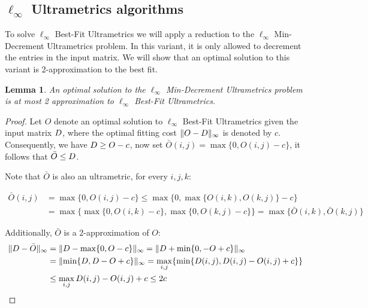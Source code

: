 \documentclass{article}
\newtheorem{lemma}[theorem]{Lemma}
\begin{document}
\subsection{\texorpdfstring{$\ell_\infty$ Ultrametrics algorithms}{l-inf Ultrametrics algorithms}}

\newcommand{\infopttree}{O}
\newcommand{\infmdopttree}{\bar{O}}
\newcommand{\maxoftwo}[2]{\max \{ #1, #2 \}}
\newcommand{\optcost}{c}

To solve $\ell_\infty$ Best-Fit Ultrametrics we will apply a reduction to the $\ell_\infty$ Min-Decrement Ultrametrics problem. In this variant, it is only allowed to decrement the entries in the input matrix. We will show that an optimal solution to this variant is 2-approximation to the best fit.
\begin{lemma}\label{lemma:md_approximation}
An optimal solution to the $\ell_\infty$ Min-Decrement Ultrametrics problem is at most 2 approximation to $\ell_\infty$ Best-Fit Ultrametrics.
\end{lemma}

\begin{proof}
Let $\infopttree$ denote an optimal solution to $\ell_\infty$ Best-Fit Ultrametrics given the input matrix $D$, where the optimal fitting cost $\infnorm{\infopttree - \inputmatrix}$ is denoted by $\optcost$. 
Consequently, we have $\inputmatrix \geq \infopttree - \optcost$, now set $\infmdopttree ({i,j}) = \max \{ 0, \infopttree ({i,j}) - \optcost \}$, it follows that  $\infmdopttree \leq \inputmatrix$.

Note that $\infmdopttree$ is also an ultrametric, for every $i,j,k$:

\begin{align*}
\infmdopttree ({i,j}) &= \maxoftwo{0}{\infopttree ({i,j}) -\optcost} \leq \maxoftwo{0}{\maxoftwo{\infopttree ({i,k})}{\infopttree ({k,j})} - \optcost} \\
&= \maxoftwo{\maxoftwo{0}{\infopttree ({i,k}) - \optcost}}{\maxoftwo{0}{\infopttree ({k,j}) - \optcost}} = \maxoftwo{\infmdopttree ({i,k})}{\infmdopttree ({k,j})}
\end{align*}

Additionally, $\infmdopttree$ is a 2-approximation of $\infopttree$: 
\begin{align*}
\infnorm{\inputmatrix-\infmdopttree} &= \infnorm{\inputmatrix-\maxoftwo{0}{\infopttree-\optcost}} = \infnorm{\inputmatrix+\min \{0, -\infopttree+\optcost \} } \\
&= \infnorm{ \min \{ \inputmatrix, \inputmatrix-\infopttree + \optcost \} } 
=\max_{i,j} \{ \min \{ \inputmatrix (i,j),\inputmatrix (i,j)-O (i,j) +c \} \} \\
&\leq \max_{i,j} \inputmatrix (i,j) - O (i,j)+c
\leq 2\optcost
\end{align*}
\end{proof}
\end{document}
